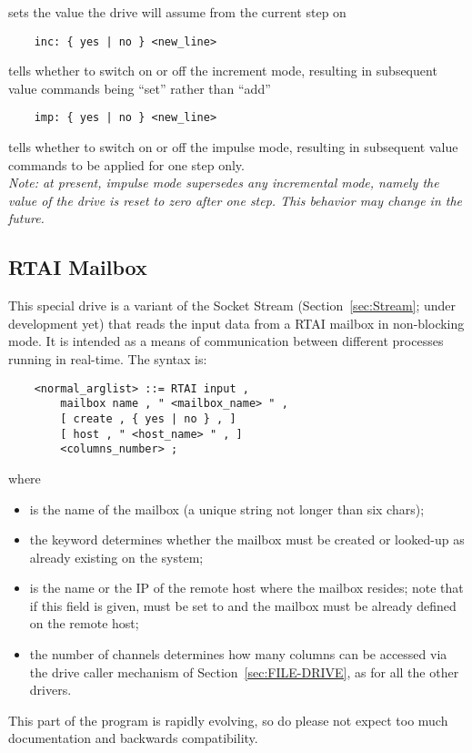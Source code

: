 sets the value the drive will assume from the current step on
\begin{verbatim}
    inc: { yes | no } <new_line>
\end{verbatim}
tells whether to switch on or off the increment mode, resulting in
subsequent value commands being ``set'' rather than ``add''
\begin{verbatim}
    imp: { yes | no } <new_line>
\end{verbatim}
tells whether to switch on or off the impulse mode, resulting in subsequent
value commands to be applied for one step only. \\
{\em 
    Note: at present, impulse mode supersedes any incremental mode, namely
    the value of the drive is reset to zero after one step.
    This behavior may change in the future.
}



\subsection{RTAI Mailbox}\label{sec:RTAI_in}
This special drive is a variant of the Socket Stream
(Section~\ref{sec:Stream}; under development yet)
that reads the input data from a RTAI mailbox in non-blocking mode.
It is intended as a means of communication between different processes
running in real-time.
The syntax is:
\begin{verbatim}
    <normal_arglist> ::= RTAI input ,
        mailbox name , " <mailbox_name> " ,
        [ create , { yes | no } , ]
        [ host , " <host_name> " , ]
        <columns_number> ;
\end{verbatim}
where
\begin{itemize}
\item {} is the name of the mailbox (a unique string 
not longer than six chars);
\item the  keyword determines whether the mailbox 
must be created or looked-up as already existing on the system;
\item {} is the name or the IP of the remote host where 
the mailbox resides; note that if this field is given,  must
be set to  and the mailbox must be already defined
on the remote host;
\item the number of channels  determines how many
columns can be accessed via the  drive caller mechanism 
of Section~\ref{sec:FILE-DRIVE}, as for all the other  drivers.
\end{itemize}
This part of the program is rapidly evolving, so do please not expect
too much documentation and backwards compatibility.

